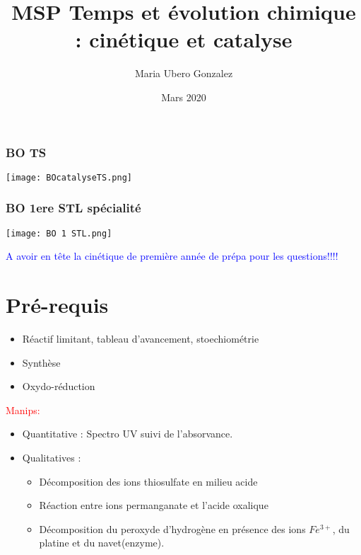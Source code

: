 \documentclass{article}
\title{MSP Temps et évolution chimique : cinétique et catalyse}
\author{Maria Ubero Gonzalez}
\date{Mars 2020}
\begin{document}
\maketitle

\subsubsection*{BO TS}

\begin{center}
    \texttt{[image: BOcatalyseTS.png]}
\end{center}

\subsubsection*{BO 1ere STL spécialité}

\begin{center}
    \texttt{[image: BO 1 STL.png]}
\end{center}

\textcolor{blue}{A avoir en tête la cinétique de première année de prépa pour les questions!!!!}

\section*{Pré-requis}


\begin{itemize}
        \item Réactif limitant, tableau d'avancement, stoechiométrie
        \item Synthèse
        \item Oxydo-réduction
\end{itemize}


\textcolor{red}{Manips:}

\begin{itemize}
    \item Quantitative : Spectro UV suivi de l'absorvance.
    \item Qualitatives :
    \begin{itemize}
        \item Décomposition des ions thiosulfate en milieu acide
        \item Réaction entre ions permanganate et l'acide oxalique
        \item Décomposition du peroxyde d'hydrogène en présence des ions $Fe^{3+}$, du platine et du navet(enzyme).
    \end{itemize}
\end{itemize}
\end{document}
